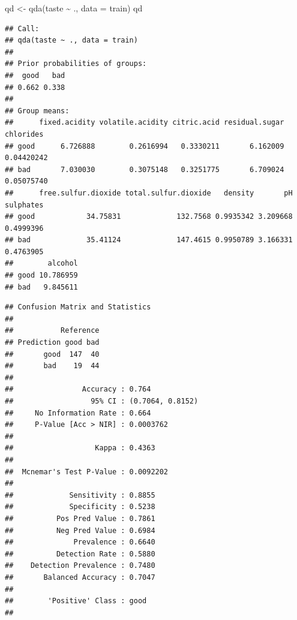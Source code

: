 \documentclass[
]{book}
\newenvironment{Shaded}{\begin{snugshade}}{\end{snugshade}}
\newcommand{\AttributeTok}[1]{\textcolor[rgb]{0.77,0.63,0.00}{#1}}
\newcommand{\FunctionTok}[1]{\textcolor[rgb]{0.00,0.00,0.00}{#1}}
\newcommand{\NormalTok}[1]{#1}
\newcommand{\OtherTok}[1]{\textcolor[rgb]{0.56,0.35,0.01}{#1}}
\newcommand{\SpecialCharTok}[1]{\textcolor[rgb]{0.00,0.00,0.00}{#1}}
\theoremstyle{break}
\theoremstyle{definition}
\theoremstyle{definition}
\theoremstyle{definition}
\theoremstyle{definition}
\theoremstyle{remark}
\begin{document}
\begin{Shaded}
\begin{Highlighting}[]
\NormalTok{qd }\OtherTok{\textless{}{-}} \FunctionTok{qda}\NormalTok{(taste }\SpecialCharTok{\textasciitilde{}}\NormalTok{ ., }\AttributeTok{data =}\NormalTok{ train)}
\NormalTok{qd}
\end{Highlighting}
\end{Shaded}

\begin{verbatim}
## Call:
## qda(taste ~ ., data = train)
## 
## Prior probabilities of groups:
##  good   bad 
## 0.662 0.338 
## 
## Group means:
##      fixed.acidity volatile.acidity citric.acid residual.sugar  chlorides
## good      6.726888        0.2616994   0.3330211       6.162009 0.04420242
## bad       7.030030        0.3075148   0.3251775       6.709024 0.05075740
##      free.sulfur.dioxide total.sulfur.dioxide   density       pH sulphates
## good            34.75831             132.7568 0.9935342 3.209668 0.4999396
## bad             35.41124             147.4615 0.9950789 3.166331 0.4763905
##        alcohol
## good 10.786959
## bad   9.845611
\end{verbatim}

\begin{Shaded}
\end{Shaded}

\begin{verbatim}
## Confusion Matrix and Statistics
## 
##           Reference
## Prediction good bad
##       good  147  40
##       bad    19  44
##                                           
##                Accuracy : 0.764           
##                  95% CI : (0.7064, 0.8152)
##     No Information Rate : 0.664           
##     P-Value [Acc > NIR] : 0.0003762       
##                                           
##                   Kappa : 0.4363          
##                                           
##  Mcnemar's Test P-Value : 0.0092202       
##                                           
##             Sensitivity : 0.8855          
##             Specificity : 0.5238          
##          Pos Pred Value : 0.7861          
##          Neg Pred Value : 0.6984          
##              Prevalence : 0.6640          
##          Detection Rate : 0.5880          
##    Detection Prevalence : 0.7480          
##       Balanced Accuracy : 0.7047          
##                                           
##        'Positive' Class : good            
## 
\end{verbatim}
\end{document}

